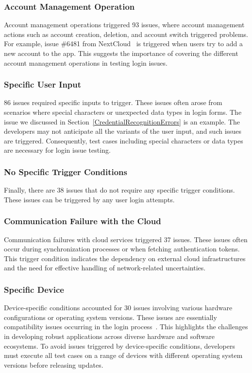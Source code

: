 \subsubsection{Account Management Operation}
Account management operations triggered 93 issues, where account management actions such as account creation, deletion, and account switch triggered problems. For example, issue \#6481 from NextCloud~\cite{nextcloud-android} is triggered when users try to add a new account to the app. This suggests the importance of covering the different account management operations in testing login issues.

\subsubsection{Specific User Input}
86 issues required specific inputs to trigger. These issues often arose from scenarios where special characters or unexpected data types in login forms. The issue we discussed in Section~\ref{CredentialRecognitionErrors} is an example. The developers may not anticipate all the variants of the user input, and such issues are triggered. Consequently, test cases including special  characters or data types are necessary for login issue testing.

\subsubsection{No Specific Trigger Conditions}
Finally, there are 38 issues that do not require any specific trigger conditions.
These issues can be triggered by any user login attempts.

\subsubsection{Communication Failure with the Cloud}
Communication failures with cloud services triggered 37 issues.
These issues often occur during synchronization processes or when fetching authentication tokens. This trigger condition indicates the dependency on external cloud infrastructures and the need for effective handling of network-related uncertainties.

\subsubsection{Specific Device}
Device-specific conditions accounted for 30 issues involving various hardware configurations or operating system versions. These issues are essentially compatibility issues occurring in the login process~\cite{chen2024demystifying,7582761}. This highlights the challenges in developing robust applications across diverse hardware and software ecosystems. To avoid issues triggered by device-specific conditions, developers must execute all test cases on a range of devices with different operating system versions before releasing updates.

